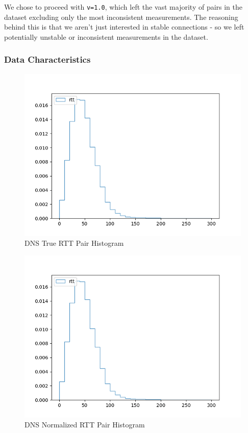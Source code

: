 We chose to proceed with \texttt{v=1.0}, which left the vast majority of pairs in the dataset excluding only the most inconsistent measurements. The reasoning behind this is that we aren't just interested in stable connections - so we left potentially unstable or inconsistent measurements in the dataset.

\subsubsection{Data Characteristics}

\begin{figure}[H]
    \centering
    \includegraphics[width=\textwidth]{images/dns/analysis_no_auth_agg/rtt/all_pairs_histogram.png}
    \caption{DNS True RTT Pair Histogram}
    \label{fig:dns_true_rtt_pair_histogram}
\end{figure}

\begin{figure}[H]
    \centering
    \includegraphics[width=\textwidth]{images/dns/analysis_no_auth_agg/rtt/all_pairs_histogram.png}
    \caption{DNS Normalized RTT Pair Histogram}
    \label{fig:dns_norm_rtt_pair_histogram}
\end{figure}


